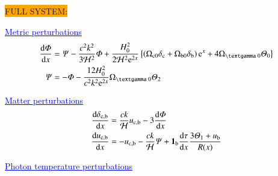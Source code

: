 




\noindent\colorbox{orange}{FULL SYSTEM:}
\par \textcolor{blue}{\underline{Metric perturbations}}
\begin{subequations}\label{mil3:theo:eq:metric_perturbations}
\begin{align}
    \dv{\Phi}{x} &= \Psi - \frac{c^2 k^2}{3\Hp^2} \Phi + \frac{H_0^2}{2\Hp^2\eu[2x]}\left\{ \left(\Omega\ped{c 0}\delta\ped{c} + \Omega\ped{b 0}\delta\ped{b} \right)\eu[x]+4\Omega\gped{\textgamma 0}\Theta_0\right\} \\
    \Psi &= - \Phi - \frac{12H_0^2}{c^2k^2\eu^{2x}} \Omega\gped{\textgamma 0}\Theta_2 
\end{align}
\end{subequations}

\par \textcolor{blue}{\underline{Matter perturbations}}
\begin{subequations}\label{mil3:theo:eq:matter_perturbations}
\begin{align}
    \dv{\delta\ensuremath{_\mathrm{c, b}}}{x} &=  \frac{ck}{\mathcal{H}} u_\mathrm{c, b} - 3\dv{\ensuremath{\varPhi}}{x}  \\
    \dv{u\ensuremath{_\mathrm{c, b}}}{x} &= - u_\mathrm{c, b} - \frac{ck}{\mathcal{H}}\varPsi + \mathbf{1}_\mathrm{b} \dv{\tau}{x} \frac{3\varTheta_1 +u_\mathrm{b}}{R(x)} 
\end{align}
\end{subequations}

\par \textcolor{blue}{\underline{Photon temperature perturbations}}


